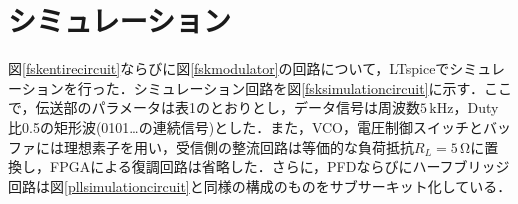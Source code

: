 \section{シミュレーション}

図\ref{fskentirecircuit}ならびに図\ref{fskmodulator}の回路について，LTspiceでシミュレーションを行った．シミュレーション回路を図\ref{fsksimulationcircuit}に示す．ここで，伝送部のパラメータは表1のとおりとし，データ信号は周波数$5 \, \mathrm{kHz}$，Duty比0.5の矩形波(0101…の連続信号)とした．また，VCO，電圧制御スイッチとバッファには理想素子を用い，受信側の整流回路は等価的な負荷抵抗$R_{L}=5 \, \mathrm{\Omega}$に置換し，FPGAによる復調回路は省略した．さらに，PFDならびにハーフブリッジ回路は図\ref{pllsimulationcircuit}と同様の構成のものをサブサーキット化している．\par 

